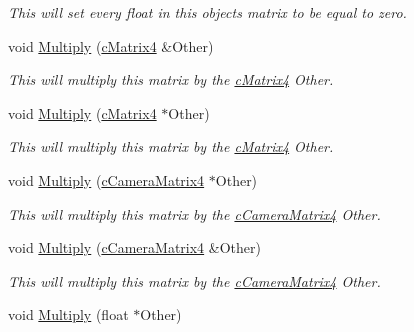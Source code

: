 \begin{DoxyCompactItemize}
\begin{DoxyCompactList}\small\item\em This will set every float in this objects matrix to be equal to zero. \end{DoxyCompactList}\item 
\hypertarget{classc_matrix4_afc8fe82a6dfb40e77abc3117d10c18e5}{
void \hyperlink{classc_matrix4_afc8fe82a6dfb40e77abc3117d10c18e5}{Multiply} (\hyperlink{classc_matrix4}{cMatrix4} \&Other)}
\label{classc_matrix4_afc8fe82a6dfb40e77abc3117d10c18e5}

\begin{DoxyCompactList}\small\item\em This will multiply this matrix by the \hyperlink{classc_matrix4}{cMatrix4} Other. \end{DoxyCompactList}\item 
\hypertarget{classc_matrix4_aa36c01bc7f4f7a7ac47c1e154cd8a4ba}{
void \hyperlink{classc_matrix4_aa36c01bc7f4f7a7ac47c1e154cd8a4ba}{Multiply} (\hyperlink{classc_matrix4}{cMatrix4} $\ast$Other)}
\label{classc_matrix4_aa36c01bc7f4f7a7ac47c1e154cd8a4ba}

\begin{DoxyCompactList}\small\item\em This will multiply this matrix by the \hyperlink{classc_matrix4}{cMatrix4} Other. \end{DoxyCompactList}\item 
\hypertarget{classc_matrix4_a4eddb15044110cb20c1fa8df80bf1e05}{
void \hyperlink{classc_matrix4_a4eddb15044110cb20c1fa8df80bf1e05}{Multiply} (\hyperlink{classc_camera_matrix4}{cCameraMatrix4} $\ast$Other)}
\label{classc_matrix4_a4eddb15044110cb20c1fa8df80bf1e05}

\begin{DoxyCompactList}\small\item\em This will multiply this matrix by the \hyperlink{classc_camera_matrix4}{cCameraMatrix4} Other. \end{DoxyCompactList}\item 
\hypertarget{classc_matrix4_a8cd8d9304a6bc454d635c2e37f340fa7}{
void \hyperlink{classc_matrix4_a8cd8d9304a6bc454d635c2e37f340fa7}{Multiply} (\hyperlink{classc_camera_matrix4}{cCameraMatrix4} \&Other)}
\label{classc_matrix4_a8cd8d9304a6bc454d635c2e37f340fa7}

\begin{DoxyCompactList}\small\item\em This will multiply this matrix by the \hyperlink{classc_camera_matrix4}{cCameraMatrix4} Other. \end{DoxyCompactList}\item 
\hypertarget{classc_matrix4_a67be2f0c0552a8c88ccd25e6fe4c3e4e}{
void \hyperlink{classc_matrix4_a67be2f0c0552a8c88ccd25e6fe4c3e4e}{Multiply} (float $\ast$Other)}
\label{classc_matrix4_a67be2f0c0552a8c88ccd25e6fe4c3e4e}


\end{DoxyCompactItemize}
